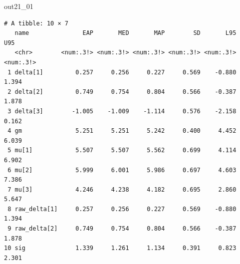 \begin{MCMCout}{}{out21_01}
	\begin{verbatim}
# A tibble: 10 × 7
   name               EAP       MED       MAP        SD       L95       U95
   <chr>        <num:.3!> <num:.3!> <num:.3!> <num:.3!> <num:.3!> <num:.3!>
 1 delta[1]         0.257     0.256     0.227     0.569    -0.880     1.394
 2 delta[2]         0.749     0.754     0.804     0.566    -0.387     1.878
 3 delta[3]        -1.005    -1.009    -1.114     0.576    -2.158     0.162
 4 gm               5.251     5.251     5.242     0.400     4.452     6.039
 5 mu[1]            5.507     5.507     5.562     0.699     4.114     6.902
 6 mu[2]            5.999     6.001     5.986     0.697     4.603     7.386
 7 mu[3]            4.246     4.238     4.182     0.695     2.860     5.647
 8 raw_delta[1]     0.257     0.256     0.227     0.569    -0.880     1.394
 9 raw_delta[2]     0.749     0.754     0.804     0.566    -0.387     1.878
10 sig              1.339     1.261     1.134     0.391     0.823     2.301
\end{verbatim}
\end{MCMCout}
